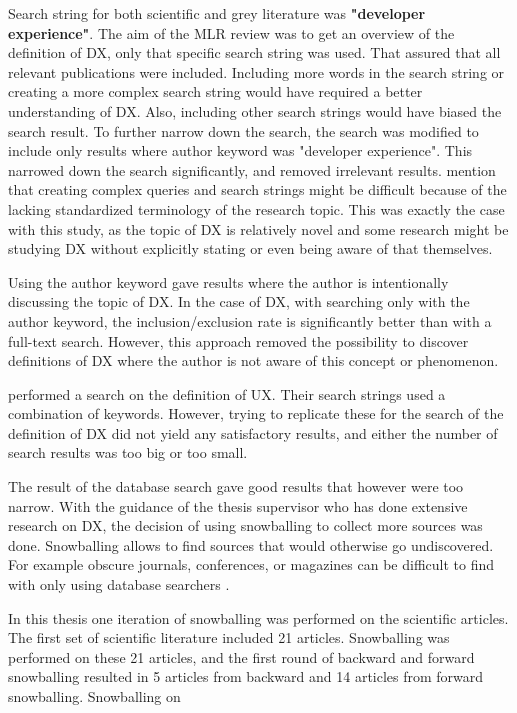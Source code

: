 \documentclass[english, 12pt, a4paper, sci, utf8, a-1b, online]{aaltothesis}
\newcounter{subsubsubsection}[subsubsection]
\begin{document}
Search string for both scientific and grey literature was \textbf{"developer experience"}. The aim of the MLR review was to get an overview of the definition of DX, only that specific search string was used. That assured that all relevant publications were included. Including more words in the search string or creating a more complex search string would have required a better understanding of DX. Also, including other search strings would have biased the search result. To further narrow down the search, the search was modified to include only results where author keyword was "developer experience". This narrowed down the search significantly, and removed irrelevant results. \textcite{guidelines-for-snowballing} mention that creating complex queries and search strings might be difficult because of the lacking standardized terminology of the research topic. This was exactly the case with this study, as the topic of DX is relatively novel and some research might be studying DX without explicitly stating or even being aware of that themselves.

Using the author keyword gave results where the author is intentionally discussing the topic of DX. In the case of DX, with searching only with the author keyword, the inclusion/exclusion rate is significantly better than with a full-text search. However, this approach removed the possibility to discover definitions of DX where the author is not aware of this concept or phenomenon.

\textcite{understanding-ux} performed a search on the definition of UX. Their search strings used a combination of keywords. However, trying to replicate these for the search of the definition of DX did not yield any satisfactory results, and either the number of search results was too big or too small.


The result of the database search gave good results that however were too narrow. With the guidance of the thesis supervisor who has done extensive research on DX, the decision of using snowballing to collect more sources was done. Snowballing allows to find sources that would otherwise go undiscovered. For example obscure journals, conferences, or magazines can be difficult to find with only using database searchers \parencite{guidelines-for-snowballing}.

In this thesis one iteration of snowballing was performed on the scientific articles. The first set of scientific literature included 21 articles. Snowballing was performed on these 21 articles, and the first round of backward and forward snowballing resulted in 5 articles from backward and 14 articles from forward snowballing. Snowballing on
\end{document}
